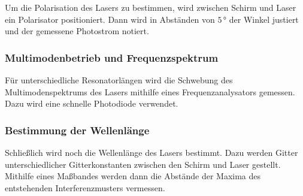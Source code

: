 Um die Polarisation des Lasers zu bestimmen, wird zwischen Schirm und Laser ein Polarisator positioniert.
Dann wird in Abständen von $5 \, °$ der Winkel justiert und der gemessene Photostrom notiert.


\subsubsection{Multimodenbetrieb und Frequenzspektrum}

Für unterschiedliche Resonatorlängen wird die Schwebung des Multimodenspektrums des Lasers mithilfe eines Frequenzanalysators gemessen. 
Dazu wird eine schnelle Photodiode verwendet.


\subsubsection{Bestimmung der Wellenlänge}

Schließlich wird noch die Wellenlänge des Lasers bestimmt.
Dazu werden Gitter unterschiedlicher Gitterkonstanten zwischen den Schirm und Laser gestellt.
Mithilfe eines Maßbandes werden dann die Abstände der Maxima des entstehenden Interferenzmusters vermessen.